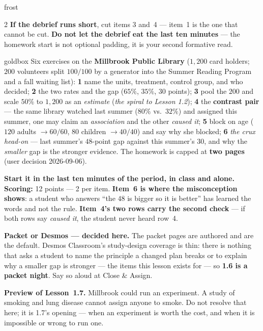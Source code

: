 \documentclass[10pt]{article}
\begin{document}
\begin{skillbox}{frost}
\begin{multicols}{2}
\textbf{If the debrief runs short}, cut items 3 and~4 --- item~1 is the one that cannot be
cut. \textbf{Do not let the debrief eat the last ten minutes} --- the homework start is not
optional padding, it is your second formative read.
\end{multicols}
\end{skillbox}

\boxguard
\begin{skillbox}{goldbox}
Six exercises on the \textbf{Millbrook Public Library} ($1{,}200$ card holders; $200$
volunteers split $100/100$ by a generator into the Summer Reading Program and a fall waiting
list): \textbf{1} name the units, treatment, control group, and who decided; \textbf{2} the
two rates and the gap ($65\%$, $35\%$, $30$ points); \textbf{3} pool the $200$ and scale
$50\%$ to $1{,}200$ as an \emph{estimate} (\emph{the spiral to Lesson 1.2}); \textbf{4} the
\textbf{contrast pair} --- the same library watched last summer ($80\%$ vs.\ $32\%$) and
assigned this summer, one may claim an \emph{association} and the other \emph{caused it};
\textbf{5} block on age ($120$ adults $\to 60/60$, $80$ children $\to 40/40$) and say why she
blocked; \textbf{6} \emph{the crux head-on} --- last summer's $48$-point gap against this
summer's $30$, and why the \emph{smaller} gap is the stronger evidence. The homework is capped
at \textbf{two pages} (user decision 2026-09-06).

\textbf{Start it in the last ten minutes of the period, in class and alone.} \textbf{Scoring:}
12 points --- 2 per item. \textbf{Item~6 is where the misconception shows}: a student who
answers ``the $48$ is bigger so it is better'' has learned the words and not the rule.
\textbf{Item~4's two rows carry the second check} --- if both rows say \emph{caused it}, the
student never heard row~4.

\textbf{Packet or Desmos --- decided here.} The packet pages are authored and are the default.
Desmos Classroom's study-design coverage is thin: there is nothing that asks a student to name
the principle a changed plan breaks or to explain why a smaller gap is stronger --- the items
this lesson exists for --- so \textbf{1.6 is a packet night}. Say so aloud at Close \& Assign.

\textbf{Preview of Lesson~1.7.} Millbrook could run an experiment. A study of smoking and lung
disease cannot assign anyone to smoke. Do not resolve that here; it is 1.7's opening --- when
an experiment is worth the cost, and when it is impossible or wrong to run one.


\end{skillbox}
\end{document}
